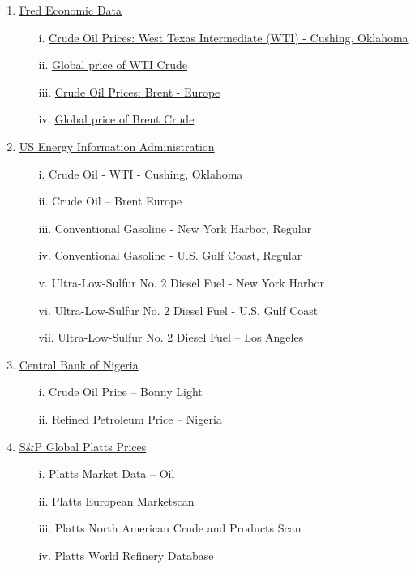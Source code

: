 \documentclass[a4paper,10pt]{article}
\begin{document}
\begin{enumerate}
    \item \href{https://fred.stlouisfed.org/}{Fred Economic Data}
    \begin{enumerate}
        \item[i.] \href{https://fred.stlouisfed.org/series/DCOILWTICO}{Crude Oil Prices: West Texas Intermediate (WTI) - Cushing, Oklahoma}
        \item[ii.] \href{https://fred.stlouisfed.org/series/POILWTIUSDM}{Global price of WTI Crude}
        \item[iii.] \href{https://fred.stlouisfed.org/series/DCOILBRENTEU}{Crude Oil Prices: Brent - Europe}
        \item[iv.] \href{https://fred.stlouisfed.org/series/POILBREUSDM}{Global price of Brent Crude}
    \end{enumerate}
    \item \href{https://www.eia.gov/}{US Energy Information Administration}
    \begin{enumerate}
        \item[i.] Crude Oil - WTI - Cushing, Oklahoma
        \item[ii.] Crude Oil – Brent Europe
        \item[iii.] Conventional Gasoline - New York Harbor, Regular
        \item[iv.] Conventional Gasoline - U.S. Gulf Coast, Regular
        \item[v.] Ultra-Low-Sulfur No. 2 Diesel Fuel - New York Harbor
        \item[vi.] Ultra-Low-Sulfur No. 2 Diesel Fuel - U.S. Gulf Coast
        \item[vii.] Ultra-Low-Sulfur No. 2 Diesel Fuel – Los Angeles
    \end{enumerate}
    \item \href{https://www.cbn.gov.ng/}{Central Bank of Nigeria}
    \begin{enumerate}
        \item[i.] Crude Oil Price – Bonny Light
        \item[ii.] Refined Petroleum Price – Nigeria
    \end{enumerate}
    \item \href{(https://www.spglobal.com/platts/en/)}{S\&P Global Platts Prices}
    \begin{enumerate}
        \item[i.] Platts Market Data – Oil
        \item[ii.] Platts European Marketscan
        \item[iii.] Platts North American Crude and Products Scan
        \item[iv.] Platts World Refinery Database
    \end{enumerate}
\end{enumerate}
			
\end{document}
